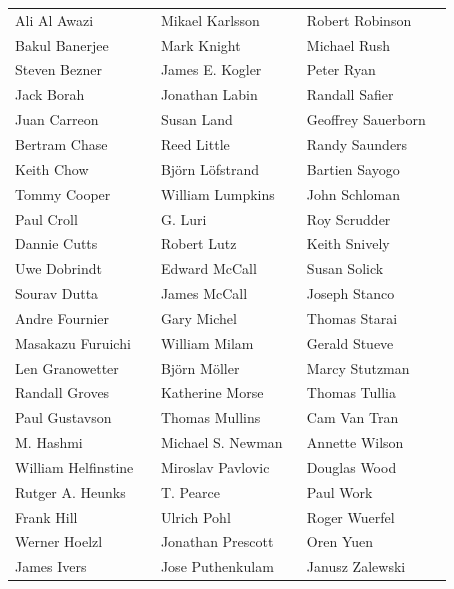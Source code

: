 {\fontsize{7.95}{8.85}\selectfont
\renewcommand{\arraystretch}{0.96}
    \begin{tabular}{@{}Y{0.31\linewidth}Y{0.31\linewidth}Y{0.31\linewidth}@{}}
        Ali Al Awazi        & Mikael Karlsson   & Robert Robinson    \\
        Bakul Banerjee      & Mark Knight       & Michael Rush       \\
        Steven Bezner       & James E. Kogler   & Peter Ryan         \\
        Jack Borah          & Jonathan Labin    & Randall Safier     \\
        Juan Carreon        & Susan Land        & Geoffrey Sauerborn \\
        Bertram Chase       & Reed Little       & Randy Saunders     \\
        Keith Chow          & Björn Löfstrand   & Bartien Sayogo     \\
        Tommy Cooper        & William Lumpkins  & John Schloman      \\
        Paul Croll          & G. Luri           & Roy Scrudder       \\
        Dannie Cutts        & Robert Lutz       & Keith Snively      \\
        Uwe Dobrindt        & Edward McCall     & Susan Solick       \\
        Sourav Dutta        & James McCall      & Joseph Stanco      \\
        Andre Fournier      & Gary Michel       & Thomas Starai      \\
        Masakazu Furuichi   & William Milam     & Gerald Stueve      \\
        Len Granowetter     & Björn Möller      & Marcy Stutzman     \\
        Randall Groves      & Katherine Morse   & Thomas Tullia      \\
        Paul Gustavson      & Thomas Mullins    & Cam Van Tran       \\
        M. Hashmi           & Michael S. Newman & Annette Wilson     \\
        William Helfinstine & Miroslav Pavlovic & Douglas Wood       \\
        Rutger A. Heunks    & T. Pearce         & Paul Work          \\
        Frank Hill          & Ulrich Pohl       & Roger Wuerfel      \\
        Werner Hoelzl       & Jonathan Prescott & Oren Yuen          \\
        James Ivers         & Jose Puthenkulam  & Janusz Zalewski    \\
    \end{tabular}}
\endgroup
\clearpage

